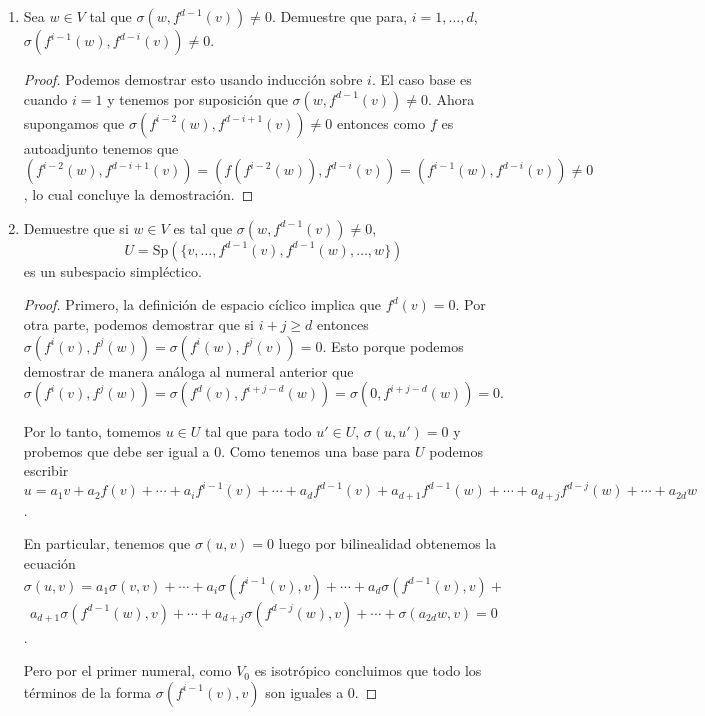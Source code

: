 \documentclass[letter,twoside,12pt]{article}
\newcommand{\Sp}{\textrm{Sp}}
\begin{document}
\begin{itemize}
\begin{enumerate}
\begin{proof}
Por lo tanto, $ \sigma(f^{i}(v),f^{j}(v)) = 0 $. El caso en que $ i > j $ es análogo al anterior.

Finalmente concluimos que 

\begin{eqnarray} 
\sigma(u,u')=\sum_{i=0}^{d-1}\sum_{j=0}^{d-1}a_ia'_j\sigma(f^i(v),f^j(v)) = \sum_{j=0}^{d-1}a_ia'_j0 = 0 \nonumber.
\end{eqnarray}

por lo que $ V_0 $ es isotrópico.
\end{proof}

\item Sea $w\in V$ tal que $\sigma(w,f^{d-1}(v))\ne 0$. Demuestre que para, $i=1,\ldots,d$, $\sigma(f^{i-1}(w),f^{d-i}(v))\ne 0$.
\begin{proof}
Podemos demostrar esto usando inducción sobre $ i $. El caso base es cuando $ i = 1 $ y tenemos por suposición que $ \sigma(w,f^{d-1}(v)) \not = 0 $. Ahora supongamos que $\sigma(f^{i-2}(w),f^{d-i+1}(v))\ne 0 $ entonces como $ f $ es autoadjunto tenemos que $ (f^{i-2}(w),f^{d-i+1}(v)) = (f(f^{i-2}(w)),f^{d-i}(v))= (f^{i-1}(w),f^{d-i}(v)) \not = 0 $, lo cual concluye la demostración. 
\end{proof}
\item Demuestre que si $w\in V$ es tal que $\sigma(w,f^{d-1}(v))\ne 0$, $$U=\Sp(\{v,\ldots,f^{d-1}(v),f^{d-1}(w),\ldots,w\})$$ es un subespacio simpl\'ectico.
\begin{proof}
Primero, la definición de espacio cíclico implica que $ f^d(v)=0 $. Por otra parte, podemos demostrar que si $ i+j\geq d $ entonces $ \sigma(f^i(v),f^j(w))= \sigma(f^i(w),f^j(v))=0 $. Esto porque podemos demostrar de manera análoga al numeral anterior que $ \sigma(f^i(v),f^j(w))=\sigma(f^d(v),f^{i+j-d}(w))=\sigma(0,f^{i+j-d}(w)) = 0 $.

Por lo tanto, tomemos $ u \in U $ tal que para todo $ u' \in U $, $ \sigma(u,u')=0 $ y probemos que debe ser igual a 0. Como tenemos una base para $ U $ podemos escribir $ u = a_1v+a_2f(v)+\cdots + a_if^{i-1}(v)+ \cdots +a_df^{d-1}(v) + a_{d+1}f^{d-1}(w)+\cdots + a_{d+j}f^{d-j}(w)+ \cdots + a_{2d}w $.

En particular, tenemos que $ \sigma(u,v)=0 $ luego por bilinealidad obtenemos la ecuación $$ \sigma(u,v) = a_1\sigma(v,v)+\cdots + a_i\sigma(f^{i-1}(v),v)+ \cdots +a_d\sigma(f^{d-1}(v),v) +$$ $$ a_{d+1}\sigma(f^{d-1}(w),v)+\cdots + a_{d+j}\sigma(f^{d-j}(w),v)+ \cdots + \sigma(a_{2d}w,v) = 0 $$.

Pero por el primer numeral, como $ V_0 $ es isotrópico concluimos que todo los términos de la forma $ \sigma(f^{i-1}(v),v) $ son iguales a 0.


\end{proof}
\end{enumerate}
\end{itemize}
\end{document}
